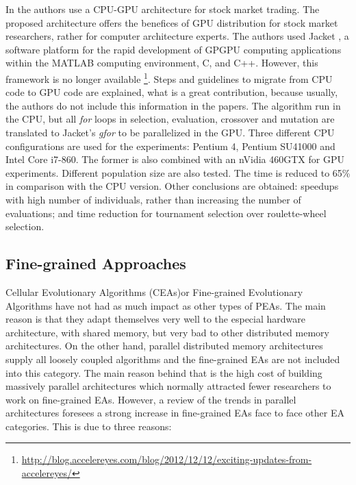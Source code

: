\documentclass{comjnl}
\begin{document}
In \cite{Contreras:2012:UGA:2150467.2150469} the authors use a CPU-GPU architecture for stock market trading. The proposed architecture offers the benefices of GPU distribution for stock market researchers, rather for computer architecture experts. The authors used Jacket \cite{jacket:Matlab}, a software platform for the rapid development of GPGPU computing applications within the MATLAB computing environment, C, and C++. However, this framework is no longer available \footnote{\url{http://blog.accelereyes.com/blog/2012/12/12/exciting-updates-from-accelereyes/}}. Steps and guidelines to migrate from CPU code to GPU code are explained, what is a great contribution, because usually, the authors do not include this information in the papers. The algorithm run in the CPU, but all  {\em for} loops in selection, evaluation, crossover and mutation are translated to Jacket's {\em gfor} to be parallelized in the GPU. Three different CPU configurations are used for the experiments: Pentium 4, Pentium SU41000 and Intel Core i7-860. The former is also combined with an nVidia 460GTX for GPU experiments. Different population size are also tested. The time is reduced to 65\% in comparison with the CPU version. Other conclusions are obtained: speedups with high number of individuals, rather than increasing the number of evaluations; and time reduction for  tournament selection  over roulette-wheel selection.

\subsection{Fine-grained Approaches}

Cellular Evolutionary Algorithms (CEAs)or Fine-grained Evolutionary Algorithms have not had as much impact as other types of PEAs. The main reason is that they adapt themselves very well to the especial hardware architecture, with shared memory, but very bad to other distributed memory architectures. On the other hand, parallel distributed memory architectures supply all loosely coupled algorithms and the fine-grained EAs are not included into this category. The main reason behind that is the high cost of building massively parallel architectures which normally attracted fewer researchers to work on fine-grained EAs. However, a review of the trends in parallel architectures foresees a strong increase in fine-grained EAs face to face other EA categories. This is due to three reasons: 
\end{document}
